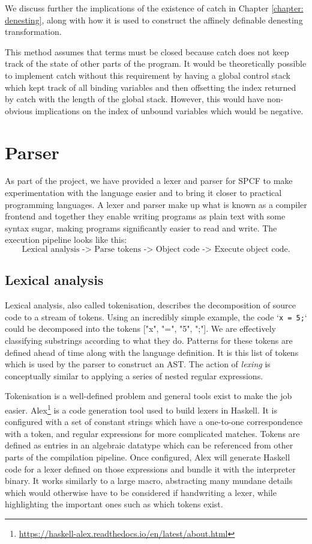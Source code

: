 \documentclass[12pt,a4paper]{report}
\theoremstyle{definition}
\theoremstyle{definition}
\theoremstyle{remark}
\begin{document}
We discuss further the implications of the existence of catch in Chapter \ref{chapter: denesting}, along with how it is used to construct the affinely definable denesting transformation.

This method assumes that terms must be closed because catch does not keep track of the state of other parts of the program. It would be theoretically possible to implement catch without this requirement by having a global control stack which kept track of all binding variables and then offsetting the index returned by catch with the length of the global stack. However, this would have non-obvious implications on the index of unbound variables which would be negative.

\section{Parser}
As part of the project, we have provided a lexer and parser for SPCF to make experimentation with the language easier and to bring it closer to practical programming languages. A lexer and parser make up what is known as a compiler frontend and together they enable writing programs as plain text with some syntax sugar, making programs significantly easier to read and write. The execution pipeline looks like this:
\[\text{Lexical analysis -> Parse tokens -> Object code -> Execute object code}.\]
\subsection{Lexical analysis}
Lexical analysis, also called tokenisation, describes the decomposition of source code to a stream of tokens. Using an incredibly simple example, the code `\lstinline{x = 5;}` could be decomposed into the tokens ["x", "=", "5", ";"]. We are effectively classifying substrings according to what they do. Patterns for these tokens are defined ahead of time along with the language definition. It is this list of tokens which is used by the parser to construct an AST. The action of \emph{lexing} is conceptually similar to applying a series of nested regular expressions.

Tokenisation is a well-defined problem and general tools exist to make the job easier. Alex\footnote{\url{https://haskell-alex.readthedocs.io/en/latest/about.html}} is a code generation tool used to build lexers in Haskell. It is configured with a set of constant strings which have a one-to-one correspondence with a token, and regular expressions for more complicated matches. Tokens are defined as entries in an algebraic datatype which can be referenced from other parts of the compilation pipeline. Once configured, Alex will generate Haskell code for a lexer defined on those expressions and bundle it with the interpreter binary. It works similarly to a large macro, abstracting many mundane details 
which would otherwise have to be considered if handwriting a lexer, while highlighting the important ones such as which tokens exist.
\end{document}
